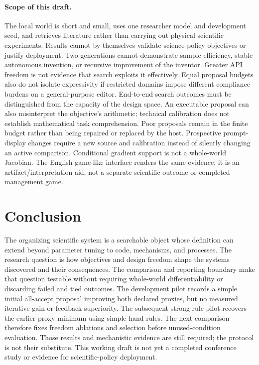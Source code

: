 \documentclass{article}
\begin{document}
\paragraph{Scope of this draft.}
The local world is short and small, uses one researcher model and development
seed, and retrieves literature rather than carrying out physical scientific
experiments. Results cannot by themselves validate science-policy objectives
or justify deployment. Two generations cannot demonstrate sample efficiency,
stable autonomous invention, or recursive improvement of the inventor.
Greater API freedom is not evidence that search exploits it effectively.
Equal proposal budgets also do not isolate expressivity if restricted domains
impose different compliance burdens on a general-purpose editor. End-to-end
search outcomes must be distinguished from the capacity of the design space.
An executable proposal can also misinterpret the objective's arithmetic;
technical calibration does not establish mathematical task comprehension.
Poor proposals remain in the finite budget rather than being repaired or
replaced by the host. Prospective prompt-display changes require a new source
and calibration instead of silently changing an active comparison.
Conditional gradient support is not a whole-world Jacobian. The English
game-like interface renders the same evidence; it is an artifact/interpretation
aid, not a separate scientific outcome or completed management game.

\section{Conclusion}
The organizing scientific system is a searchable object whose definition can
extend beyond parameter tuning to code, mechanisms, and processes. The research
question is how objectives and design freedom shape the systems discovered and
their consequences. The comparison and reporting boundary make that question
testable without requiring whole-world differentiability or discarding failed
and tied outcomes. The development pilot records a simple initial all-accept
proposal improving both declared proxies, but no measured iterative gain or
feedback superiority. The subsequent strong-rule pilot recovers the earlier
proxy minimum using simple hand rules. The next comparison therefore fixes
freedom ablations and selection before unused-condition evaluation. Those results
and mechanistic evidence are still required; the protocol is not their substitute.
This working draft is not yet a completed conference study or evidence for
scientific-policy deployment.
\end{document}

